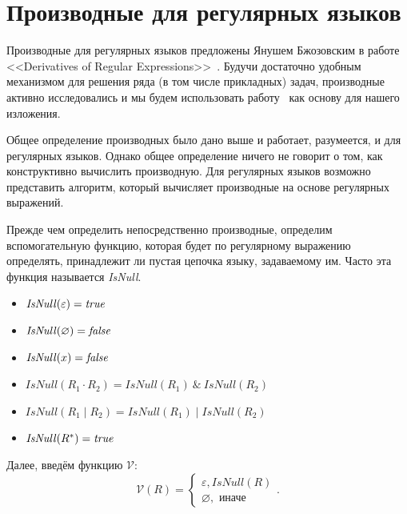 \section{Производные для регулярных языков}
\label{sec:DerivativesForRegex}

Производные для регулярных языков предложены Янушем Бжозовским в работе <<Derivatives of Regular Expressions>>~.
Будучи достаточно удобным механизмом для решения ряда (в том числе прикладных) задач, производные активно исследовались и мы будем использовать работу~ как основу для нашего изложения.

Общее определение производных было дано выше и работает, разумеется, и для регулярных языков.
Однако общее определение ничего не говорит о том, как конструктивно вычислить производную.
Для регулярных языков возможно представить алгоритм, который вычисляет производные на основе регулярных выражений.

Прежде чем определить непосредственно производные, определим вспомогательную функцию, которая будет по регулярному выражению определять, принадлежит ли пустая цепочка языку, задаваемому им.
Часто эта функция называется \emph{IsNull}.

\begin{itemize}
    \item $\mathit{IsNull}(\varepsilon) = \emph{true}$
    \item $\mathit{IsNull}(\varnothing) = \emph{false}$
    \item $\mathit{IsNull}(x) = \emph{false}$
    \item $\mathit{IsNull}(R_1 \cdot R_2) = \mathit{IsNull}(R_1) \ \& \ \mathit{IsNull}(R_2) $
    \item $\mathit{IsNull}(R_1 \mid R_2) = \mathit{IsNull}(R_1) \mid \mathit{IsNull}(R_2) $
    \item $\mathit{IsNull}(R^*) = \emph{true}$
\end{itemize}

Далее, введём функцию $\mathcal{V}$:
\[
    \mathcal{V}(R) =
    \begin{cases}
            \varepsilon, \mathit{IsNull}(R) \\
        \varnothing, \text{ иначе}
    \end{cases}.
\]


